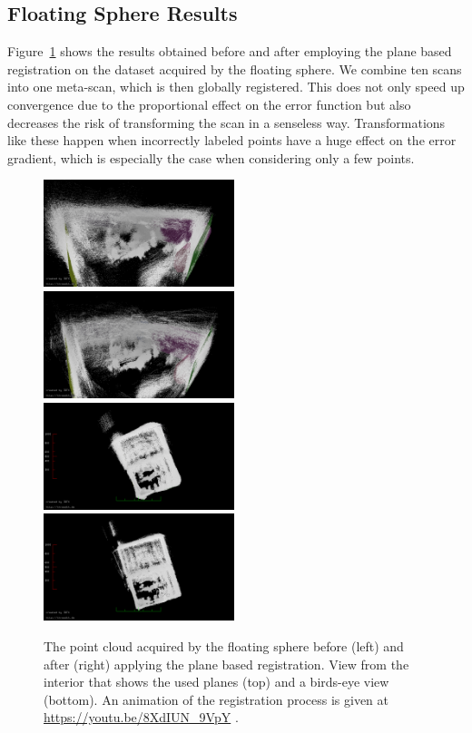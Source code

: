 \subsection{Floating Sphere Results}

Figure~\ref{fig:cylon-corrected} shows the results obtained before and after employing the plane based registration on the dataset acquired by the floating sphere.
We combine ten scans into one meta-scan, which is then globally registered.
This does not only speed up convergence due to the proportional effect on the error function but also decreases the risk of transforming the scan in a senseless way.
Transformations like these happen when incorrectly labeled points have a huge effect on the error gradient, which is especially the case when considering only a few points.

\begin{figure}
	\centering
	\includegraphics[width=0.495\textwidth]{./images/cylon_uncorr_corner}\hfill
	\includegraphics[width=0.495\textwidth]{./images/cylon_corr_corner}\\
	\includegraphics[width=0.495\textwidth]{./images/cylon_uncorr_top}\hfill
	\includegraphics[width=0.495\textwidth]{./images/cylon_corr_top}
	\caption{The point cloud acquired by the floating sphere before (left) and after (right) applying the plane based registration. View from the interior that shows the used planes (top) and a birds-eye view (bottom). An animation of the registration process is given at \url{https://youtu.be/8XdIUN_9VpY} .}
	\label{fig:cylon-corrected}
\end{figure}
